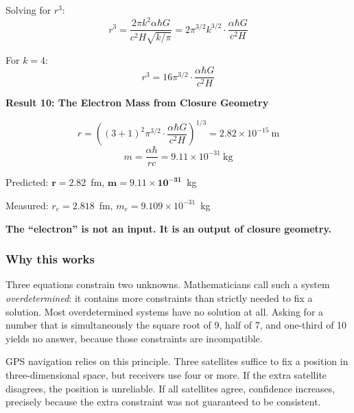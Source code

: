 \documentclass[aps,prd,preprint,superscriptaddress,showpacs,preprintnumbers,amsmath,amssymb,nofootinbib]{revtex4-2}
\begin{document}
Solving for $r^3$:
\begin{equation}
r^3 = \frac{2\pi k^2 \alpha \hbar G}{c^2 H \sqrt{k/\pi}} = 2\pi^{3/2} k^{3/2} \cdot \frac{\alpha \hbar G}{c^2 H}
\label{eq:r-cubed}
\end{equation}

For $k = 4$:
\begin{equation}
r^3 = 16 \pi^{3/2} \cdot \frac{\alpha \hbar G}{c^2 H}
\end{equation}

\vspace{1.5em}
\noindent
\colorbox{resultgreen}{\parbox{\dimexpr\textwidth-2\fboxsep\relax}{%
\vspace{0.8em}
\centering
\textbf{\large Result 10: The Electron Mass from Closure Geometry}

\vspace{0.5em}
\boldmath
\begin{equation}
r = \left( (3+1)^2 \pi^{3/2} \cdot \frac{\alpha \hbar G}{c^2 H} \right)^{1/3} = 2.82 \times 10^{-15}~\text{m}
\end{equation}
\begin{equation}
m = \frac{\alpha \hbar}{rc} = 9.11 \times 10^{-31}~\text{kg}
\end{equation}
\unboldmath

\vspace{0.3em}
Predicted: $\bm{r = 2.82}$~fm, $\bm{m = 9.11 \times 10^{-31}}$~kg

Measured: $r_e = 2.818$~fm, $m_e = 9.109 \times 10^{-31}$~kg

\textbf{The ``electron'' is not an input. It is an output of closure geometry.}
\vspace{0.5em}
}}
\vspace{1cm}

\subsubsection*{Why this works}

Three equations constrain two unknowns. Mathematicians call such a system \emph{overdetermined}: it contains more constraints than strictly needed to fix a solution. Most overdetermined systems have no solution at all. Asking for a number that is simultaneously the square root of 9, half of 7, and one-third of 10 yields no answer, because those constraints are incompatible.

GPS navigation relies on this principle. Three satellites suffice to fix a position in three-dimensional space, but receivers use four or more. If the extra satellite disagrees, the position is unreliable. If all satellites agree, confidence increases, precisely because the extra constraint was not guaranteed to be consistent.
\end{document}
